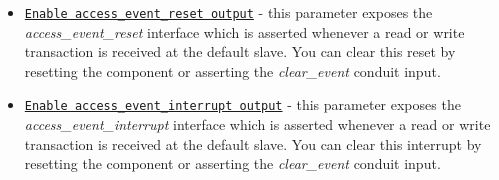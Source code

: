 \documentclass{article}
\begin{document}
\begin{flushleft}
\begin{itemize}
\item \texttt{\underline{Enable access\_event\_reset output}} - this parameter exposes the \emph{access\_event\_reset} interface which is asserted whenever a read or write transaction is received at the default slave.  You can clear this reset by resetting the component or asserting the \emph{clear\_event} conduit input.

\item \texttt{\underline{Enable access\_event\_interrupt output}} - this parameter exposes the \emph{access\_event\_interrupt} interface which is asserted whenever a read or write transaction is received at the default slave.  You can clear this interrupt by resetting the component or asserting the \emph{clear\_event} conduit input.

\end{itemize}

\end{flushleft}

\end{document}
